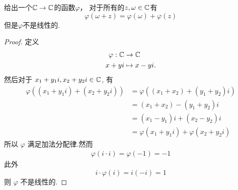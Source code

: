 \begin{problem}{9}
  给出一个$\mathbb{C}\rightarrow\mathbb{C}$的函数$\varphi$，
  对于所有的$z,\omega\in\mathbb{C}$有
  \begin{displaymath}
    \varphi(\omega+z) = \varphi(\omega) +\varphi(z)
  \end{displaymath}
  但是$\varphi$不是线性的.
\end{problem}

\begin{proof}
  定义
  \begin{align*}
    \varphi:\mathbb{C}&\to\mathbb{C}\\
    x + yi &\mapsto x - yi. 
  \end{align*}
  然后对于 $x_1 + y_1i, x_2 + y_2i\in\mathbb{C}$, 有
  \begin{align*}
    \varphi((x_1 + y_1i) + (x_2 + y_2i)) &= \varphi((x_1 + x_2) + (y_1 + y_2)i)\\ 
                                         &= (x_1 + x_2) - (y_1 + y_2)i\\ 
                                         &= (x_1 - y_1)i + (x_2 - y_2)i\\ 
                                         &= \varphi(x_1 + y_1i) + \varphi(x_2 + y_2i)
  \end{align*}
  所以 $\varphi$ 满足加法分配律.然而
  \begin{align*}
    \varphi(i\cdot i) = \varphi(-1) = -1
  \end{align*}
  此外
  \begin{equation*}
    i\cdot\varphi(i) = i(-i) = 1 
  \end{equation*}
  则 $\varphi$ 不是线性的.
\end{proof}
